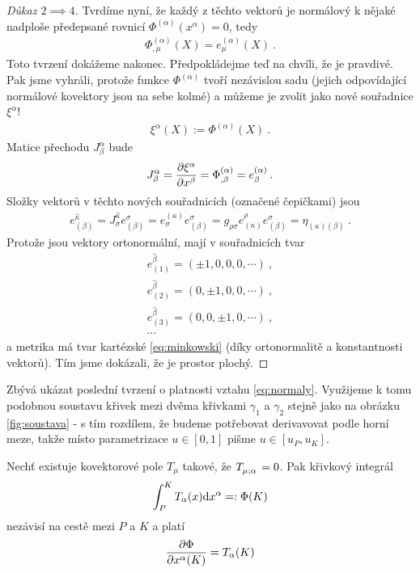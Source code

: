 \documentclass{article}
\begin{document}
\begin{proof}[Důkaz $2 \implies 4$]
    Tvrdíme nyní, že každý z těchto vektorů je normálový k nějaké nadploše předepsané rovnicí $\Phi^{(\alpha)}(x^\alpha) = 0$, tedy
    \begin{align}
        \Phi^{(\alpha)}_{,\mu}(X) = e^{(\alpha)}_\mu (X) \:. \label{eq:normaly}
    \end{align}
    Toto tvrzení dokážeme nakonec. Předpokládejme teď na chvíli, že je pravdivé. Pak jsme vyhráli, protože funkce $\Phi^{(\alpha)}$ tvoří nezávislou sadu (jejich odpovídající normálové kovektory jsou na sebe kolmé) a můžeme je zvolit jako nové souřadnice $\xi^\alpha$!
    \begin{align}
        \xi^\alpha(X) := \Phi^{(\alpha)}(X) \:.
    \end{align}
    Matice přechodu $J^\alpha_\beta$ bude
    \begin{align}
        J^\alpha_\beta = \frac{\partial \xi^\alpha}{\partial x^\beta} = \Phi^{(\alpha)}_{,\beta} = e^{(\alpha)}_\beta \:.
    \end{align}
    Složky vektorů v těchto nových souřadnicích (označené čepičkami) jsou
    \begin{align}
        e^{\hat \kappa}_{(\beta)} = J^{\hat \kappa}_\sigma e^{\sigma}_{(\beta)} = e^{(\kappa)}_{\sigma} e^{\sigma}_{(\beta)} = g_{\rho \sigma} e^{\rho}_{(\kappa)} e^{\sigma}_{(\beta)} = \eta_{(\kappa)(\beta)} \:.
    \end{align}
    Protože jsou vektory ortonormální, mají v souřadnicích tvar
    \begin{align}
        e^{\hat \beta}_{(1)} = (\pm 1, 0 , 0 , 0 , \cdots) \:, \\
        e^{\hat \beta}_{(2)} = (0, \pm 1 , 0 , 0 , \cdots) \:, \\
        e^{\hat \beta}_{(3)} = (0, 0 , \pm 1 , 0 , \cdots) \:, \\
        \cdots
    \end{align}
    a metrika má tvar kartézské \eqref{eq:minkowski} (díky ortonormalitě a konstantnosti vektorů). Tím jsme dokázali, že je prostor plochý.
\end{proof}

Zbývá ukázat poslední tvrzení o platnosti vztahu \eqref{eq:normaly}. Využijeme k tomu podobnou soustavu křivek mezi dvěma křivkami $\gamma_1$ a $\gamma_2$ stejně jako na obrázku \vref{fig:soustava} - s tím rozdílem, že budeme potřebovat derivavovat podle horní meze, takže místo parametrizace $u \in [0,1]$ pišme $u \in [u_P, u_K]$.


\begin{theorem}
    Nechť existuje kovektorové pole $T_\mu$ takové, že $T\indices{_\mu_;_\alpha} = 0$. Pak křivkový integrál
    \begin{align}
        \int_P^K T_\alpha(x) \mathrm{d} x^\alpha =: \Phi(K)
    \end{align}
    nezávisí na cestě mezi $P$ a $K$ a platí
    \begin{align}
        \frac{\partial \Phi}{\partial x^\alpha(K)} = T_\alpha(K)
    \end{align}
\end{theorem}
\end{document}
